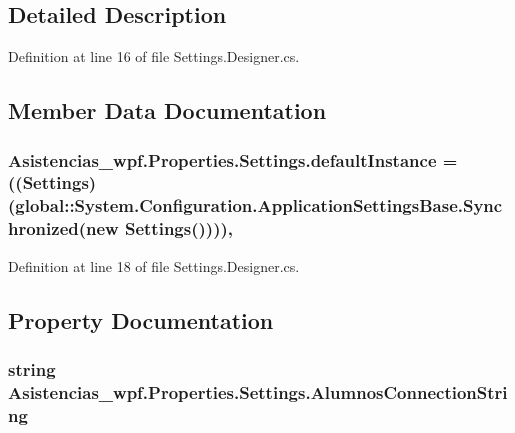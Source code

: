 \subsection{Detailed Description}


Definition at line 16 of file Settings.\-Designer.\-cs.



\subsection{Member Data Documentation}
\hypertarget{class_asistencias__wpf_1_1_properties_1_1_settings_aa4bd314d77e181189954ca60be029aff}{
\subsubsection[{default\-Instance}]{ Asistencias\-\_\-wpf.\-Properties.\-Settings.\-default\-Instance = (({\bf Settings})(global\-::\-System.\-Configuration.\-Application\-Settings\-Base.\-Synchronized(new {\bf Settings}())))\hspace{0.3cm}{\ttfamily [static]}, {\ttfamily [private]}}}\label{class_asistencias__wpf_1_1_properties_1_1_settings_aa4bd314d77e181189954ca60be029aff}


Definition at line 18 of file Settings.\-Designer.\-cs.



\subsection{Property Documentation}
\hypertarget{class_asistencias__wpf_1_1_properties_1_1_settings_a91e7c9a0cab95ea486d06d98a5152432}{
\subsubsection[{Alumnos\-Connection\-String}]{\setlength{\rightskip}{0pt plus 5cm}string Asistencias\-\_\-wpf.\-Properties.\-Settings.\-Alumnos\-Connection\-String\hspace{0.3cm}{\ttfamily [get]}}}\label{class_asistencias__wpf_1_1_properties_1_1_settings_a91e7c9a0cab95ea486d06d98a5152432}


